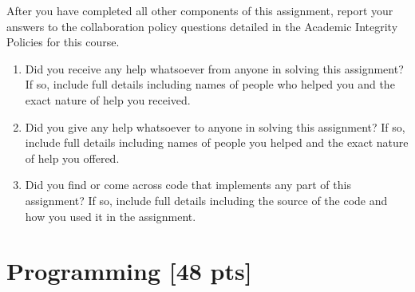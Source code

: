\documentclass[11pt,addpoints,answers]{exam}
\numberwithin{equation}{section} %
\numberwithin{figure}{section} %
\numberwithin{table}{section} %
\newcommand{\pts}[1]{\textbf{[#1 pts]}}
\begin{document}
    After you have completed all other components of this assignment, report your answers to the collaboration policy questions detailed in the Academic Integrity Policies for this course.
    \begin{enumerate}
        \item Did you receive any help whatsoever from anyone in solving this assignment? If so, include full details including names of people who helped you and the exact nature of help you received.
        
        \begin{tcolorbox}[fit,height=4cm, width=15cm, blank, borderline={1pt}{-2pt},nobeforeafter]
       \end{tcolorbox}
        \item Did you give any help whatsoever to anyone in solving this assignment? If so, include full details including names of people you helped and the exact nature of help you offered.
        
        \begin{tcolorbox}[fit,height=4cm, width=15cm, blank, borderline={1pt}{-2pt},nobeforeafter]
       \end{tcolorbox}
        \item Did you find or come across code that implements any part of this assignment? If so, include full details including the source of the code and how you used it in the assignment.
        
        \begin{tcolorbox}[fit,height=4cm, width=15cm, blank, borderline={1pt}{-2pt},nobeforeafter]
       \end{tcolorbox}
    \end{enumerate}
\clearpage
\section{Programming \pts{48} }
\label{sec:code}
\end{document}
